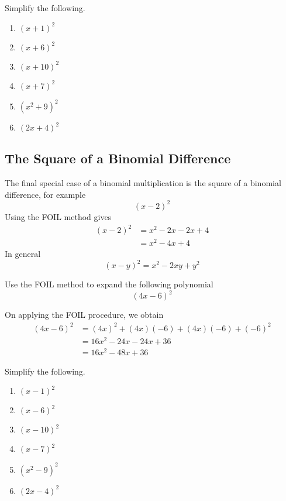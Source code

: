 \begin{myexample}
Simplify the following.
\drillandskill
\end{myexample}
\begin{enumerate}
	\item $(x+1)^2$ 
	\item $(x+6)^2$
	\item $(x+10)^2$
	\item $(x+7)^2$
	\item $(x^2+9)^2$
	\item $(2x+4)^2$
\end{enumerate}

\subsection{The Square of a Binomial Difference}\label{sec:bindiff}
The final special case of a binomial multiplication is the square of a binomial difference, for example
\[
	(x-2)^2
\]
Using the FOIL method gives
\begin{align*}
	(x-2)^2 & =		x^2-2x-2x+4 \\
	        & =		x^2-4x+4    
\end{align*} 
In general
\[
	(x-y)^2 = x^2-2xy+y^2
\]
\begin{myexample}
Use the FOIL method to expand the following polynomial 
\[
	(4x-6)^2
\]
{}
\end{myexample}
\begin{myProof}
	On applying the FOIL procedure, we obtain
	\begin{align*}
		(4x-6)^2 & =		(4x)^2+(4x)(-6)+(4x)(-6)+(-6)^2 \\
		         & =		16x^2 - 24x - 24x +36           \\
		         & =		16x^2-48x+36                    
	\end{align*} 
\end{myProof}

\begin{myexample}
Simplify the following.
\drillandskill
\end{myexample}
\begin{enumerate}
	\item $(x-1)^2$
	\item $(x-6)^2$
	\item $(x-10)^2$
	\item $(x-7)^2$
	\item $(x^2-9)^2$
	\item $(2x-4)^2$
\end{enumerate}

